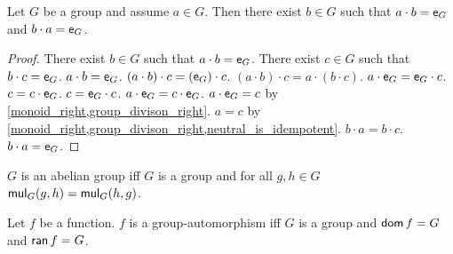 \begin{proposition}\label{leftinverse_eq_rightinverse}
    Let $G$ be a group and assume $a \in G$.
    Then there exist $b\in G$ 
    such that $a \cdot b = \neutral[G]$ and $b \cdot a = \neutral[G]$.
\end{proposition}
\begin{proof}
    There exist $b \in G$ such that $a \cdot b = \neutral[G]$.
    There exist $c \in G$ such that $b \cdot c = \neutral[G]$.
    $a \cdot b = \neutral[G]$.
    $(a \cdot b) \cdot c = (\neutral[G]) \cdot c$.
    $(a \cdot b) \cdot c = a \cdot (b \cdot c)$.
    $a \cdot \neutral[G] = \neutral[G] \cdot c$.
    $c = c \cdot \neutral[G]$.
    $c = \neutral[G] \cdot c$.
    $a \cdot \neutral[G] = c \cdot \neutral[G]$.
    $a \cdot \neutral[G] = c$ by \cref{monoid_right,group_divison_right}.
    $a = c$ by \cref{monoid_right,group_divison_right,neutral_is_idempotent}.
    $b \cdot a = b \cdot c$.
    $b \cdot a = \neutral[G]$.
\end{proof}

\begin{definition}\label{group_abelian}
    $G$ is an abelian group iff $G$ is a group and for all $g,h \in G$ $\mul[G](g,h) = \mul[G](h,g)$. 
\end{definition}


\begin{definition}\label{group_automorphism}
    Let $f$ be a function. $f$ is a group-automorphism iff $G$ is a group and $\dom{f}=G$ and $\ran{f}=G$. 
\end{definition}
